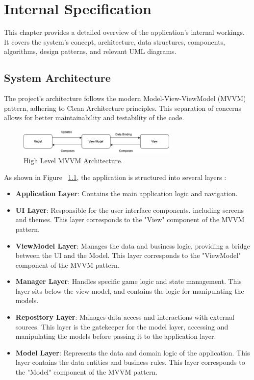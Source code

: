 \chapter{Internal Specification}
\label{chap:internal-specifications}

This chapter provides a detailed overview of the application's internal workings. It covers the system's concept, architecture, data structures, components, algorithms, design patterns, and relevant UML diagrams.

\section{System Architecture}

The project's architecture follows the modern Model-View-ViewModel (MVVM) pattern, adhering to Clean Architecture principles. This separation of concerns allows for better maintainability and testability of the code.

\begin{figure}[ht!]
    \centering
    \includegraphics[width=0.7\textwidth]{img/mvvm_explanation.png}
    \caption{High Level MVVM Architecture.}
    \label{fig:mvvm_explanation}
\end{figure}

As shown in Figure ~\ref{fig:mvvm_explanation}, the application is structured into several layers \cite{bib:mvvm}:

\begin{itemize}
    \item \textbf{Application Layer}: Contains the main application logic and navigation.
    \item \textbf{UI Layer}: Responsible for the user interface components, including screens and themes. This layer corresponds to the "View" component of the MVVM pattern.
    \item \textbf{ViewModel Layer}: Manages the data and business logic, providing a bridge between the UI and the Model. This layer corresponds to the "ViewModel" component of the MVVM pattern.
    \item \textbf{Manager Layer}: Handles specific game logic and state management. This layer sits below the view model, and contains the logic for manipulating the models.
    \item \textbf{Repository Layer}: Manages data access and interactions with external sources. This layer is the gatekeeper for the model layer, accessing and manipulating the models before passing it to the application layer.
    \item \textbf{Model Layer}: Represents the data and domain logic of the application. This layer contains the data entities and business rules. This layer corresponds to the "Model" component of the MVVM pattern.
\end{itemize}


